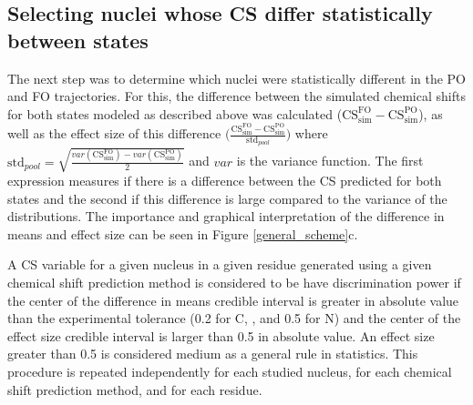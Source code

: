 \documentclass[%
 aip,
 amsmath,amssymb,
 preprint,%
]{revtex4-1}
\newcommand{\ca}{\ce{C_\alpha} }
\newcommand{\cb}{\ce{C_\beta} }
\begin{document}
\subsection{Selecting nuclei whose CS differ statistically between states}

The next step was to determine which nuclei were statistically different in the PO and FO trajectories. For this, the difference between the simulated chemical shifts for both states modeled as described above was calculated ($\text{CS}_{\text{sim}}^{\text{FO}}-\text{CS}_{\text{sim}}^{\text{PO}}$), as well as the effect size of this difference $\big(\frac{\text{CS}_{\text{sim}}^{\text{FO}}-\text{CS}_{\text{sim}}^{\text{PO}}}{\text{std}_{pool}}\big)$ where $\text{std}_{pool}=\sqrt{\frac{var(\text{CS}^{\text{FO}}_{\text{sim}})-var(\text{CS}^{\text{PO}}_{\text{sim}})}{2}}$ and $var$ is the variance function. The first expression measures if there is a difference between the CS predicted for both states and the second if this difference is large compared to the variance of the distributions. The importance and graphical interpretation of the difference in means and effect size can be seen in Figure \ref{general_scheme}c. 

 A CS variable for a given nucleus in a given residue generated using a given chemical shift prediction method is considered to be have discrimination power if the center of the difference in means credible interval is greater in absolute value than the experimental tolerance (\SI{0.2}{\ppm} for C, \ca, \cb and \SI{0.5}{\ppm} for N) and the center of the effect size credible interval is larger than 0.5 in absolute value. An effect size greater than 0.5 is considered medium as a general rule in statistics\cite{Sawilowsky2009}. 
This procedure is repeated independently for each studied nucleus, for each chemical shift prediction method, and for each residue. 
\end{document}
